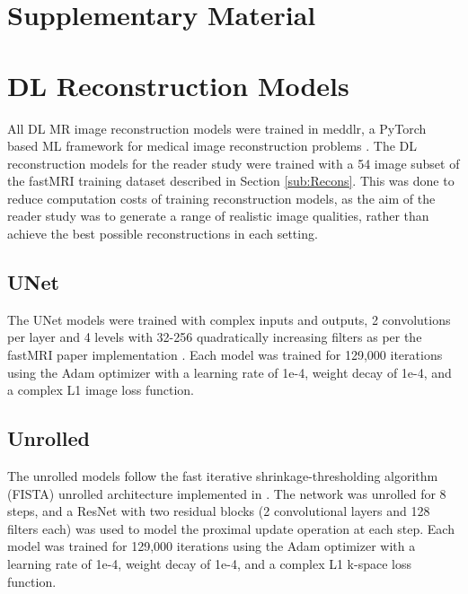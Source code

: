 \documentclass[AMA,STIX2COL,Linenumberson]{MRM}
\begin{document}
%
\vfill\pagebreak

\clearpage


\renewcommand{\thesection}{\Alph{section}}
\setcounter{section}{0} %
\setcounter{figure}{0} %
\setcounter{table}{0} %
\renewcommand{\thefigure}{S\arabic{figure}} %
\renewcommand{\thetable}{S\arabic{table}}   %

\section*{Supplementary Material}

\renewcommand{\thefigure}{S\arabic{figure} }    
\renewcommand{\thetable}{S\arabic{table} }    
\setcounter{figure}{0}    
\setcounter{table}{0}

\section{DL Reconstruction Models}\label{App:Models}
All DL MR image reconstruction models were trained in meddlr, a PyTorch based ML framework for medical image reconstruction problems \cite{desai2023noise2recon}. The DL reconstruction models for the reader study were trained with a 54 image subset of the fastMRI training dataset described in Section \ref{sub:Recons}. This was done to reduce computation costs of training reconstruction models, as the aim of the reader study was to generate a range of realistic image qualities, rather than achieve the best possible reconstructions in each setting.

\subsection{UNet}
The UNet models were trained with complex inputs and outputs, 2 convolutions per layer and 4 levels with 32-256 quadratically increasing filters as per the fastMRI paper implementation \cite{Knoll2020tp}. Each model was trained for 129,000 iterations using the Adam optimizer with a learning rate of 1e-4, weight decay of 1e-4, and a complex L1 image loss function.

\subsection{Unrolled}
The unrolled models follow the fast iterative shrinkage-thresholding algorithm (FISTA) unrolled architecture \cite{xin2023fista} implemented in \cite{sandino2020compressed}. The network was unrolled for 8 steps, and a ResNet with two residual blocks (2 convolutional layers and 128 filters each) was used to model the proximal update operation at each step. Each model was trained for 129,000 iterations using the Adam optimizer with a learning rate of 1e-4, weight decay of 1e-4, and a complex L1 k-space loss function.
\end{document}
